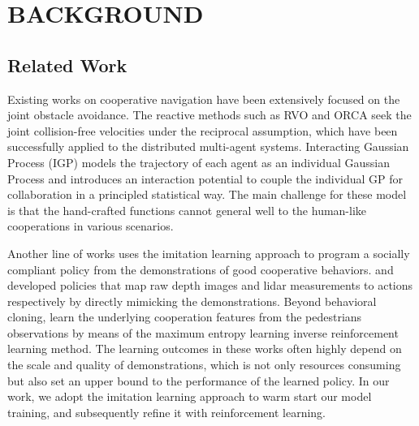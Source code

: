 \documentclass[letterpaper, 10 pt, conference]{ieeeconf}  %
\begin{document}
\section{BACKGROUND} \label{sec:background} 

\subsection{Related Work}

Existing works on cooperative navigation have been extensively focused on the joint obstacle avoidance. The reactive methods such as RVO \cite{berg_reciprocal_2008} and ORCA \cite{van_den_berg_reciprocal_2011} seek the joint collision-free velocities under the reciprocal assumption, which have been successfully applied to the distributed multi-agent systems. Interacting Gaussian Process (IGP) models the trajectory of each agent as an individual Gaussian Process and introduces an interaction potential to couple the individual GP for collaboration in a principled statistical way. The main challenge for these model is that the hand-crafted functions cannot general well to the human-like cooperations in various scenarios. 

Another line of works uses the imitation learning approach to program a socially compliant policy from the demonstrations of good cooperative behaviors. \cite{tai_socially_2017} and \cite{long_deep-learned_2017} developed policies that map raw depth images and lidar measurements to actions respectively by directly mimicking the demonstrations. Beyond behavioral cloning, \cite{roy_feature-based_2013, kretzschmar_socially_2016, pfeiffer_predicting_2016} learn the underlying cooperation features from the pedestrians observations by means of the maximum entropy learning inverse reinforcement learning method. The learning outcomes in these works often highly depend on the scale and quality of demonstrations, which is not only resources consuming but also set an upper bound to the performance of the learned policy. In our work, we adopt the imitation learning approach to warm start our model training, and subsequently refine it with reinforcement learning. 
\end{document}
